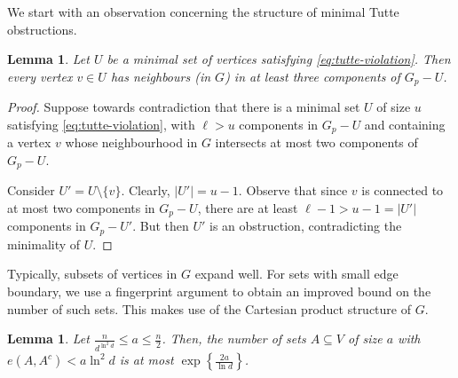 \documentclass[notitlepage]{scrartcl}
\newtheorem{lemma}[thm]{Lemma}
\begin{document}
We start with an observation concerning the structure of minimal Tutte obstructions.
\begin{lemma} \label{lem:three_edges}
Let $U$ be a minimal set of vertices satisfying \eqref{eq:tutte-violation}. Then every vertex $v \in U$ has neighbours (in $G$) in at least three components of $G_p-U$.
\end{lemma}
\begin{proof}
Suppose towards contradiction that there is a minimal set $U$ of size $u$ satisfying \eqref{eq:tutte-violation}, with $\ell>u$ components in $G_p-U$ and containing a vertex $v$ whose neighbourhood in $G$ intersects at most two components of $G_p-U$.

Consider $U'=U \setminus \{v\}$. Clearly, $|U'|=u-1$. Observe that since $v$ is connected to at most two components in $G_p-U$, there are at least $\ell-1>u-1=|U'|$ components in $G_p-U'$. But then $U'$ is an obstruction, contradicting the minimality of $U$.
\end{proof}

Typically, subsets of vertices in $G$ expand well. For sets with small edge boundary, we use a fingerprint argument to obtain an improved bound on the number of such sets. This makes use of the Cartesian product structure of $G$.

\begin{lemma}\label{lem:small-boundary-sets}
Let $\frac{n}{d^{\ln^2 d}}\le a\le \frac{n}{2}$. Then, the number of sets $A\subseteq V$ of size $a$ with $e(A,A^c)< a\ln^2d$ is at most $\exp\left\{\frac{2a}{\ln d}\right\}$.
\end{lemma}
\end{document}
